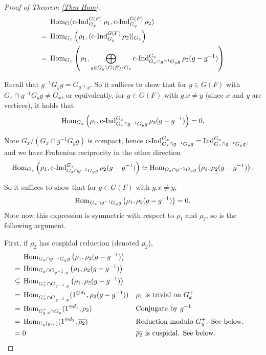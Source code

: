 	\begin{proof}[Proof of Theorem \ref{Thm Hom}]
		\begin{equation*}
			\begin{aligned}
				&\operatorname{\operatorname{Hom}}_G(\operatorname{\operatorname{c-Ind}}_{G_x}^{G(F)}\rho_1, \operatorname{\operatorname{c-Ind}}_{G_y}^{G(F)}\rho_2)\\
				=\;&\operatorname{\operatorname{Hom}}_{G_x}\left(\rho_1,(\operatorname{\operatorname{c-Ind}}_{G_y}^{G(F)}\rho_2)|_{G_x}\right)\\
				=\;& \operatorname{\operatorname{Hom}}_{G_x}\left(\rho_1, \bigoplus_{g \in {G_y\backslash G(F)/G_x}}\operatorname{\operatorname{c-Ind}}_{G_x \cap g^{-1}G_yg}^{G_x}\rho_2(g-g^{-1})\right)
			\end{aligned}
		\end{equation*}
		
		Recall that $g^{-1}G_yg=G_{g^{-1}.y}$. So it suffices to show that for $g \in G(F)$ with $G_x \cap g^{-1}G_yg \neq G_x$, or equivalently, for $g \in G(F)$ with $g.x \neq y$ (since $x$ and $y$ are vertices), it holds that
		$$\operatorname{\operatorname{Hom}}_{G_x}\left(\rho_1, \operatorname{\operatorname{c-Ind}}_{G_x \cap g^{-1}G_yg}^{G_x}\rho_2(g-g^{-1})\right)=0.$$
		
		Note $G_x/(G_x \cap g^{-1}G_yg)$ is compact, hence $\operatorname{\operatorname{c-Ind}}_{G_x \cap g^{-1}G_yg}^{G_x}=\operatorname{Ind}_{G_x \cap g^{-1}G_yg}^{G_x}$, and we have Frobenius reciprocity in the other direction
		$$\operatorname{\operatorname{Hom}}_{G_x}\left(\rho_1, \operatorname{\operatorname{c-Ind}}_{G_x \cap g^{-1}G_yg}^{G_x}\rho_2(g-g^{-1})\right) \simeq \operatorname{\operatorname{Hom}}_{G_x \cap g^{-1}G_yg}\left(\rho_1, \rho_2(g-g^{-1})\right).$$
		
		So it suffices to show that for $g \in G(F)$ with $g.x \neq y$,
		$$\operatorname{\operatorname{Hom}}_{G_x \cap g^{-1}G_yg}\left(\rho_1, \rho_2(g-g^{-1})\right)=0.$$
		Note now this expression is symmetric with respect to $\rho_1$ and $\rho_2$, so is the following argument.
		
		First, if $\rho_2$ has cuspidal reduction (denoted $\overline{\rho_2}$),
		\begin{align*}    	
			& \Hom_{G_x \cap g^{-1}G_yg}\left(\rho_1, \rho_2(g-g^{-1})\right) \\
			=\;& \Hom_{G_x \cap G_{g^{-1}.y}}\left(\rho_1, \rho_2(g-g^{-1})\right) \\
			\subseteq\;& \Hom_{G_x^+ \cap G_{g^{-1}.y}}\left(\rho_1, \rho_2(g-g^{-1})\right) && %
			\\
			=\;& \Hom_{G_x^+ \cap G_{g^{-1}.y}}(1^{\oplus d_1}, \rho_2(g-g^{-1})) && \text{$\rho_1$ is trivial on $G_x^+$ }\\
			=\;& \Hom_{G_{g.x}^+ \cap G_y}(1^{\oplus d_1}, \rho_2) && \text{Conjugate by $g^{-1}$}\\
			=\;& \Hom_{U_y(g.x)}(1^{\oplus d_1}, \overline{\rho_2}) && \text{Reduction modulo $G_y^+$. See below.}\\
			=\;& 0 && \text{$\overline{\rho_2}$ is cuspidal. See below.}
		\end{align*}
		

\end{proof}
